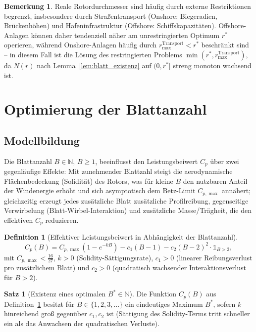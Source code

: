 ﻿\documentclass[a4paper,12pt]{article}
\theoremstyle{definition}
\newtheorem{definition}{Definition}
\newtheorem{satz}{Satz}
\newtheorem{bemerkung}{Bemerkung}
\begin{document}
\begin{bemerkung}
Reale Rotordurchmesser sind häufig durch externe Restriktionen begrenzt, insbesondere durch Straßentransport (Onshore: Biegeradien, Brückenhöhen) und Hafeninfrastruktur (Offshore: Schiffskapazitäten). Offshore-Anlagen können daher tendenziell näher am unrestringierten Optimum $r^*$ operieren, während Onshore-Anlagen häufig durch $r_{\max}^{\mathrm{Transport}} < r^*$ beschränkt sind -- in diesem Fall ist die Lösung des restringierten Problems $\min(r^*, r_{\max}^{\mathrm{Transport}})$, da $N(r)$ nach Lemma~\ref{lem:blatt_existenz} auf $(0,r^*]$ streng monoton wachsend ist.
\end{bemerkung}

\section{Optimierung der Blattanzahl}

\subsection{Modellbildung}

Die Blattanzahl $B \in \mathbb{N}$, $B\ge1$, beeinflusst den Leistungsbeiwert $C_p$ über zwei gegenläufige Effekte: Mit zunehmender Blattzahl steigt die aerodynamische Flächenbedeckung (Solidität) des Rotors, was für kleine $B$ den nutzbaren Anteil der Windenergie erhöht und sich asymptotisch dem Betz-Limit $C_{p,\max}$ annähert; gleichzeitig erzeugt jedes zusätzliche Blatt zusätzliche Profilreibung, gegenseitige Verwirbelung (Blatt-Wirbel-Interaktion) und zusätzliche Masse/Trägheit, die den effektiven $C_p$ reduzieren.

\begin{definition}[Effektiver Leistungsbeiwert in Abhängigkeit der Blattanzahl]
\label{def:cpB}
\[
C_p(B) = C_{p,\max}\left(1 - e^{-kB}\right) - c_1(B-1) - c_2 (B-2)^2 \cdot \mathbb{1}_{B>2},
\]
mit $C_{p,\max}<\tfrac{16}{27}$, $k>0$ (Solidity-Sättigungsrate), $c_1>0$ (linearer Reibungsverlust pro zusätzlichem Blatt) und $c_2>0$ (quadratisch wachsender Interaktionsverlust für $B>2$).
\end{definition}

\begin{satz}[Existenz eines optimalen $B^*\in\mathbb{N}$]
\label{satz:blattzahl}
Die Funktion $C_p(B)$ aus Definition~\ref{def:cpB} besitzt für $B\in\{1,2,3,\ldots\}$ ein eindeutiges Maximum $B^*$, sofern $k$ hinreichend groß gegenüber $c_1,c_2$ ist (Sättigung des Solidity-Terms tritt schneller ein als das Anwachsen der quadratischen Verluste).
\end{satz}
\end{document}
